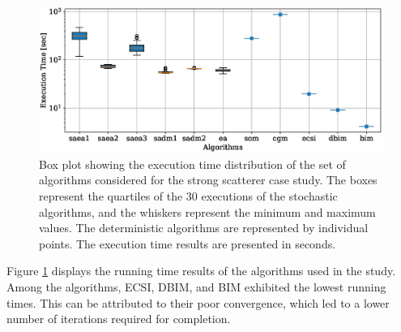 		
			\begin{figure}
				\centering
				\includegraphics[width=.9\textwidth]{./figuras/casestudy/strong/boxplot_time}
				\caption[Box plot showing the execution time distribution of the set of algorithms considered for the strong scatterer case study.]{Box plot showing the execution time distribution of the set of algorithms considered for the strong scatterer case study. The boxes represent the quartiles of the 30 executions of the stochastic algorithms, and the whiskers represent the minimum and maximum values. The deterministic algorithms are represented by individual points. The execution time results are presented in seconds.}
				\label{fig:results:casestudy:strong:boxplot:time}
			\end{figure}
		
			
			Figure \ref{fig:results:casestudy:strong:boxplot:time} displays the running time results of the algorithms used in the study. Among the algorithms, ECSI, DBIM, and BIM exhibited the lowest running times. This can be attributed to their poor convergence, which led to a lower number of iterations required for completion.
			
